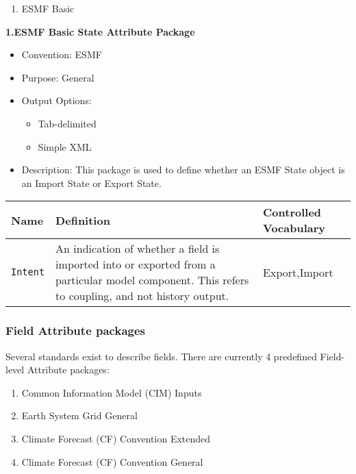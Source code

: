 \begin{enumerate}
    \item ESMF Basic
\end{enumerate}



\vspace{.20in}
{\bf 1.ESMF Basic State Attribute Package}

\begin{itemize}
    \item Convention: ESMF
    \item Purpose: General
    \item Output Options:
    \begin{itemize}
        \item Tab-delimited
        \item Simple XML 
    \end{itemize}
    \item Description: This package is used to define whether an ESMF State object is an Import State or Export State.   
\end{itemize}

\begin{tabular}{|p{6cm}|p{10cm}|p{10cm}|}
    {\bf Name } & {\bf Definition} & {\bf Controlled Vocabulary} \\
    \hline\hline
    {\tt Intent} & An indication of whether a field is imported into or exported from a particular model component. This refers to coupling, and not history output. & Export,Import \\
\end{tabular}


\vspace{.20in}
\subsubsection{Field Attribute packages}
\label{FieldAttributePackages}

Several standards exist to describe fields. There are currently 4 predefined Field-level Attribute packages:

\begin{enumerate}
    \item Common Information Model (CIM) Inputs
    \item Earth System Grid General
    \item Climate Forecast (CF) Convention Extended
    \item Climate Forecast (CF) Convention General
\end{enumerate}



